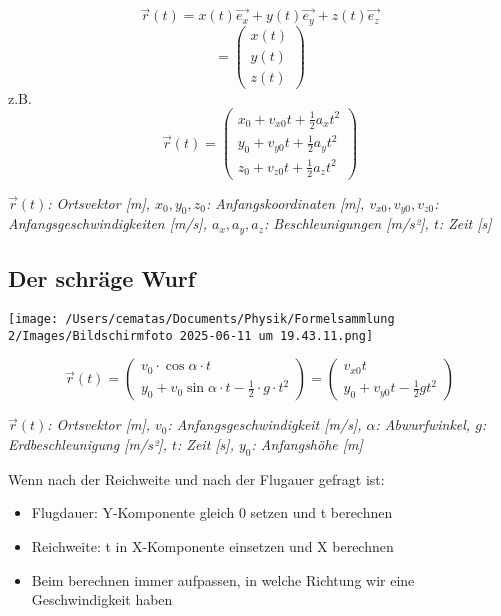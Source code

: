 \documentclass[a4paper,10pt]{article}
\newenvironment{displayformula}
{
	\begin{framed}
		\color{formulaColor}
	}
	{\end{framed}}
\newcommand{\formulalegend}[1]{%
	\par\vspace{0.5ex}%
	{{\color{legendColor}\RaggedRight\small\textit{#1}}}%
	\par\vspace{1.5ex}%
}
\begin{document}
\begin{displayformula}
	\[
	\vec{r}(t) = x(t)\vec{e_x} + y(t)\vec{e_y} + z(t)\vec{e_z}
	\]
	\[
	=
	\begin{pmatrix}
		x(t)\\
		y(t) \\
		z(t)
	\end{pmatrix}
	\]
	z.B.
	\[
	\vec{r}(t) = \begin{pmatrix}
		x_0 + v_{x0}t + \frac{1}{2}a_x t^2 \\
		y_0 + v_{y0}t + \frac{1}{2}a_y t^2 \\
		z_0 + v_{z0}t + \frac{1}{2}a_z t^2 
	\end{pmatrix}
	\]
\end{displayformula}
\formulalegend{
	\( \vec{r}(t) \): Ortsvektor [m], \( x_0, y_0, z_0 \): Anfangskoordinaten [m], \( v_{x0}, v_{y0}, v_{z0} \): Anfangsgeschwindigkeiten [m/s], \( a_x, a_y, a_z \): Beschleunigungen [m/s²], \( t \): Zeit [s]
}

\newpage

\subsection{Der schräge Wurf}

\texttt{[image: /Users/cematas/Documents/Physik/Formelsammlung 2/Images/Bildschirmfoto 2025-06-11 um 19.43.11.png]}

\begin{displayformula}
	\[
	\vec{r}(t) =
	\begin{pmatrix}
		v_0 \cdot \cos\alpha \cdot t\\
		y_0 + v_0\sin\alpha \cdot t - \frac{1}{2} \cdot g \cdot t^2
	\end{pmatrix}
	=
	\begin{pmatrix}
		v_{x0} t\\
		y_0 + v_{y0} t - \frac{1}{2} g t^2
	\end{pmatrix}
	\]
\end{displayformula}
\formulalegend{
	\( \vec{r}(t) \): Ortsvektor [m], \( v_0 \): Anfangsgeschwindigkeit [m/s], \( \alpha \): Abwurfwinkel, \( g \): Erdbeschleunigung [m/s²], \( t \): Zeit [s], \( y_0 \): Anfangshöhe [m]
}
	Wenn nach der Reichweite und nach der Flugauer gefragt ist:
\begin{itemize}

	\item Flugdauer: Y-Komponente gleich 0 setzen und t berechnen
	\item Reichweite: t in X-Komponente einsetzen und X berechnen
	\item Beim berechnen immer aufpassen, in welche Richtung wir eine Geschwindigkeit haben
\end{itemize}
\end{document}
